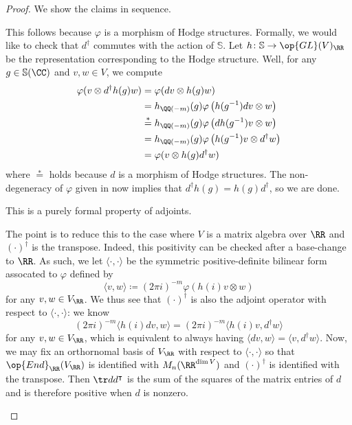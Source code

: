 \documentclass[../thesis.tex]{subfiles}
\begin{document}
\begin{proof}
	We show the claims in sequence.
	\begin{listalph}
		\item This follows because $\varphi$ is a morphism of Hodge structures. Formally, we would like to check that $d^\dagger$ commutes with the action of $\mathbb S$. Let $h\colon\mathbb S\to\op{GL}(V)_\RR$ be the representation corresponding to the Hodge structure. Well, for any $g\in\mathbb S(\CC)$ and $v,w\in V$, we compute
		\begin{align*}
			\varphi(v\otimes d^\dagger h(g)w) &= \varphi(dv\otimes h(g)w) \\
			&= h_{\QQ(-m)}(g)\varphi\left(h(g^{-1})dv\otimes w\right) \\
			&\stackrel*= h_{\QQ(-m)}(g)\varphi\left(dh(g^{-1})v\otimes w\right) \\
			&= h_{\QQ(-m)}(g)\varphi\left(h(g^{-1})v\otimes d^\dagger w\right) \\
			&= \varphi(v\otimes h(g)d^\dagger w)
		\end{align*}
		where $\stackrel*=$ holds because $d$ is a morphism of Hodge structures. The non-degeneracy of $\varphi$ given in  now implies that $d^\dagger h(g)=h(g)d^\dagger$, so we are done.
		\item This is a purely formal property of adjoints.
		\item The point is to reduce this to the case where $V$ is a matrix algebra over $\RR$ and $(\cdot)^\dagger$ is the transpose. Indeed, this positivity can be checked after a base-change to $\RR$. As such, we let $\langle\cdot,\cdot\rangle$ be the symmetric positive-definite bilinear form assocated to $\varphi$ defined by
		\[\langle v,w\rangle\coloneqq(2\pi i)^{-m}\varphi(h(i)v\otimes w)\]
		for any $v,w\in V_\RR$. We thus see that $(\cdot)^\dagger$ is also the adjoint operator with respect to $\langle\cdot,\cdot\rangle$: we know
		\[(2\pi i)^{-m}\langle h(i)dv,w\rangle=(2\pi i)^{-m}\langle h(i)v,d^\dagger w\rangle\]
		for any $v,w\in V_\RR$, which is equivalent to always having $\langle dv,w\rangle=\langle v,d^\dagger w\rangle$. Now, we may fix an orthornomal basis of $V_\RR$ with respect to $\langle\cdot,\cdot\rangle$ so that $\op{End}_\RR(V_\RR)$ is identified with $M_n(\RR^{\dim V})$ and $(\cdot)^\dagger$ is identified with the transpose. Then $\tr dd^\intercal$ is the sum of the squares of the matrix entries of $d$ and is therefore positive when $d$ is nonzero.
		\qedhere
	\end{listalph}
\end{proof}
\end{document}
